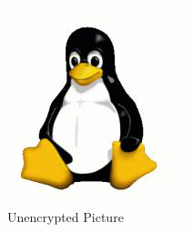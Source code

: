  \begin{minipage}{\linewidth}
      \centering
      \begin{minipage}{0.4\linewidth}
          \begin{figure}[H]
              \includegraphics[width=\linewidth]{figures/TuxCleartext.png}
              \caption{Unencrypted Picture}
              \label{fig:tuxclr}
          \end{figure}
      \end{minipage}
      \hspace{0.05\linewidth}
      \begin{minipage}{0.4\linewidth}
          \begin{figure}[H]

\end{figure}
\end{minipage}
\end{minipage}

